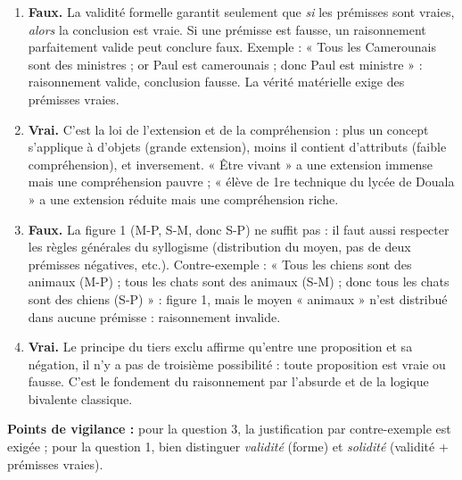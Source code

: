 \documentclass[11pt]{article}
\newcommand{\cle}[1]{{\popxbold\color{popdark}#1}}
\begin{document}
\begin{corrige}
\begin{enumerate}
    \item \textbf{Faux.} La validité formelle garantit seulement que \emph{si} les prémisses sont vraies, \emph{alors} la conclusion est vraie. Si une prémisse est fausse, un raisonnement parfaitement valide peut conclure faux. Exemple : « Tous les Camerounais sont des ministres ; or Paul est camerounais ; donc Paul est ministre » : raisonnement valide, conclusion fausse. La vérité matérielle exige des prémisses vraies.
    \item \textbf{Vrai.} C'est la loi de l'\cle{extension et de la compréhension} : plus un concept s'applique à d'objets (grande extension), moins il contient d'attributs (faible compréhension), et inversement. « Être vivant » a une extension immense mais une compréhension pauvre ; « élève de 1re technique du lycée de Douala » a une extension réduite mais une compréhension riche.
    \item \textbf{Faux.} La figure 1 (M-P, S-M, donc S-P) ne suffit pas : il faut aussi respecter les règles générales du syllogisme (distribution du moyen, pas de deux prémisses négatives, etc.). Contre-exemple : « Tous les chiens sont des animaux (M-P) ; tous les chats sont des animaux (S-M) ; donc tous les chats sont des chiens (S-P) » : figure 1, mais le moyen « animaux » n'est distribué dans aucune prémisse : raisonnement invalide.
    \item \textbf{Vrai.} Le \cle{principe du tiers exclu} affirme qu'entre une proposition et sa négation, il n'y a pas de troisième possibilité : toute proposition est vraie ou fausse. C'est le fondement du raisonnement par l'absurde et de la logique bivalente classique.
\end{enumerate}
\textbf{Points de vigilance :} pour la question 3, la justification par contre-exemple est exigée ; pour la question 1, bien distinguer \emph{validité} (forme) et \emph{solidité} (validité + prémisses vraies).
\end{corrige}
\end{document}
